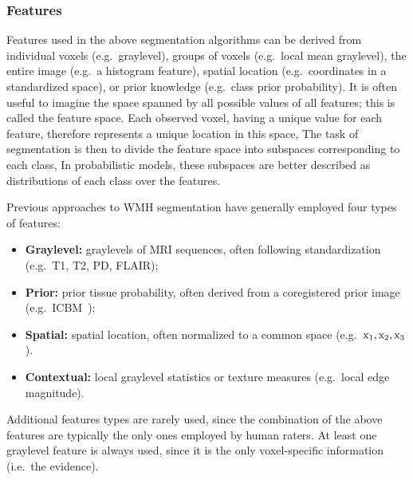 \subsubsection{Features}\label{sss:prior-feats}
Features used in the above segmentation algorithms can be derived from
individual voxels (e.g.\ graylevel),
groups of voxels (e.g.\ local mean graylevel),
the entire image (e.g.\ a histogram feature),
spatial location (e.g.\ coordinates in a standardized space), or
prior knowledge (e.g.\ class prior probability).
It is often useful to imagine the space spanned by all possible values of all features;
this is called the feature space.
Each observed voxel, having a unique value for each feature,
therefore represents a unique location in this space,
The task of segmentation is then to divide the feature space into
subspaces corresponding to each class,
In probabilistic models,
these subspaces are better described as distributions of each class over the features.
\par
Previous approaches to WMH segmentation have generally employed four types of features:
\begin{itemize}
  \item \textbf{Graylevel:}
  graylevels of MRI sequences, often following standardization
  (e.g.\ T1, T2, PD, FLAIR);
  \item \textbf{Prior:}
  prior tissue probability, often derived from a coregistered prior image
  (e.g.\ ICBM~\cite{Mazziotta2001});
  \item \textbf{Spatial:}
  spatial location, often normalized to a common space
  (e.g.\ $\mathrm{x}_1,\mathrm{x}_2,\mathrm{x}_3$).
  \item \textbf{Contextual:}
  local graylevel statistics or texture measures
  (e.g.\ local edge magnitude).
\end{itemize}
Additional features types are rarely used,
since the combination of the above features are typically the only ones employed by human raters.
At least one graylevel feature is always used,
since it is the only voxel-specific information (i.e.\ the evidence).
